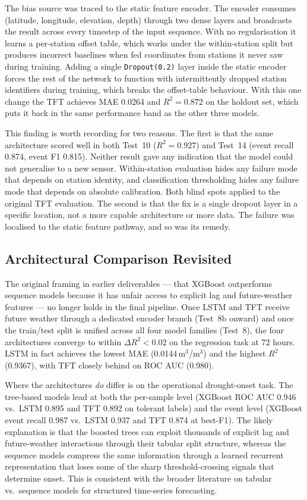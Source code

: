 \documentclass[12pt, a4paper]{article}
\begin{document}
The bias source was traced to the static feature encoder. The encoder consumes
(latitude, longitude, elevation, depth) through two dense layers and broadcasts
the result across every timestep of the input sequence. With no regularisation
it learns a per-station offset table, which works under the within-station
split but produces incorrect baselines when fed coordinates from stations it
never saw during training. Adding a single \texttt{Dropout(0.2)} layer inside
the static encoder forces the rest of the network to function with intermittently
dropped station identifiers during training, which breaks the offset-table
behaviour. With this one change the TFT achieves MAE 0.0264 and $R^2 = 0.872$
on the holdout set, which puts it back in the same performance band as the
other three models.

This finding is worth recording for two reasons. The first is that the same
architecture scored well in both Test~10 ($R^2 = 0.927$) and Test~14 (event
recall 0.874, event F1 0.815). Neither result gave any indication that the
model could not generalise to a new sensor. Within-station evaluation hides any
failure mode that depends on station identity, and classification thresholding
hides any failure mode that depends on absolute calibration. Both blind spots
applied to the original TFT evaluation. The second is that the fix is a single
dropout layer in a specific location, not a more capable architecture or more
data. The failure was localised to the static feature pathway, and so was its
remedy.

\subsection{Architectural Comparison Revisited}

The original framing in earlier deliverables --- that XGBoost outperforms
sequence models because it has unfair access to explicit lag and future-weather
features --- no longer holds in the final pipeline. Once LSTM and TFT receive
future weather through a dedicated encoder branch (Test~8b onward) and once
the train/test split is unified across all four model families (Test~8), the
four architectures converge to within $\Delta R^2 < 0.02$ on the regression
task at 72 hours. LSTM in fact achieves the lowest MAE (0.0144\,m$^3$/m$^3$)
and the highest $R^2$ (0.9367), with TFT closely behind on ROC AUC (0.980).

Where the architectures \emph{do} differ is on the operational drought-onset
task. The tree-based models lead at both the per-sample level (XGBoost ROC AUC
0.946 vs.\ LSTM 0.895 and TFT 0.892 on tolerant labels) and the event level
(XGBoost event recall 0.987 vs.\ LSTM 0.937 and TFT 0.874 at best-F1). The
likely explanation is that the boosted trees can exploit thousands of explicit
lag and future-weather interactions through their tabular split structure,
whereas the sequence models compress the same information through a learned
recurrent representation that loses some of the sharp threshold-crossing
signals that determine onset. This is consistent with the broader literature
on tabular vs.\ sequence models for structured time-series forecasting.
\end{document}
